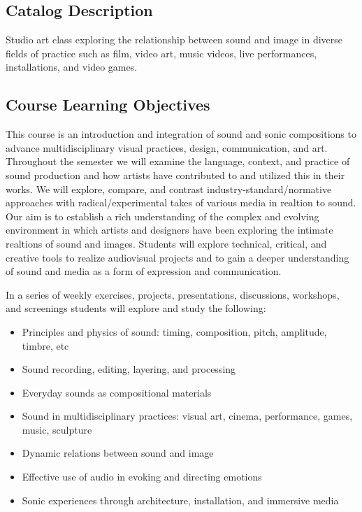 \subsection{Catalog Description}

Studio art class exploring the relationship between sound and image in diverse fields of practice such as film, video art, music videos, live performances, installations, and video games.

\subsection{Course Learning Objectives}

This course is an introduction and integration of sound and sonic compositions to advance multidisciplinary visual practices, design, communication, and art. Throughout the semester we will examine the language, context, and practice of sound production and how artists have contributed to and utilized this in their works. We will explore, compare, and contrast industry-standard/normative approaches with radical/experimental takes of various media in realtion to sound. Our aim is to establish a rich understanding of the complex and evolving environment in which artists and designers have been exploring the intimate realtions of sound and images. Students will explore technical, critical, and creative tools to realize audiovisual projects and to gain a deeper understanding of sound and media as a form of expression and communication.

In a series of weekly exercises, projects, presentations, discussions, workshops, and screenings students will explore and study the following:

\begin{itemize}
      \tightlist
      \item Principles and physics of sound: timing, composition, pitch, amplitude, timbre, etc
      \item Sound recording, editing, layering, and processing
      \item Everyday sounds as compositional materials
      \item Sound in multidisciplinary practices: visual art, cinema, performance, games, music, sculpture
      \item Dynamic relations between sound and image
      \item Effective use of audio in evoking and directing emotions
      \item Sonic experiences through architecture, installation, and immersive media
\end{itemize}

